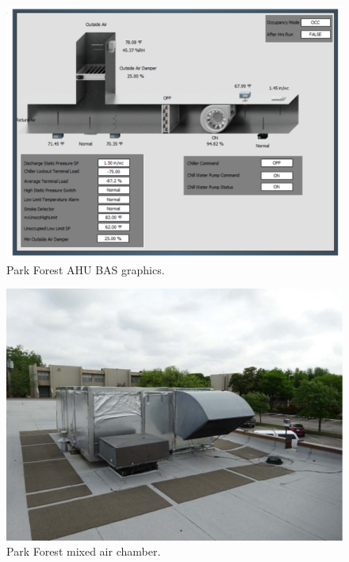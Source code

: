 \begin{figure}
\centering
\includegraphics[width=\textwidth]{Images/ParkForestAHUGraphic.PNG}
\caption{Park Forest AHU BAS graphics.}
\label{fig:ParkForestAHUGraphic}
\end{figure}

\begin{figure}
\centering
\includegraphics[width=\textwidth]{Images/ParkForestMixedAirChamber.PNG}
\caption{Park Forest mixed air chamber.}
\label{fig:ParkForestMixedAirChamber}
\end{figure}

